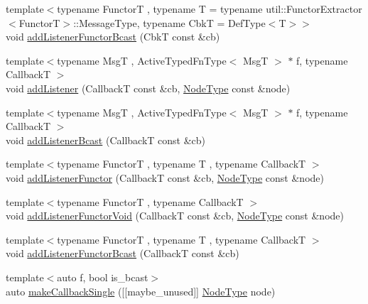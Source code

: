\begin{DoxyCompactItemize}
\item 
{\footnotesize template$<$typename FunctorT , typename T  = typename util\+::\+Functor\+Extractor$<$\+Functor\+T$>$\+::\+Message\+Type, typename CbkT  = Def\+Type$<$\+T$>$$>$ }\\void \hyperlink{structvt_1_1pipe_1_1_pipe_manager_t_l_a3bbcc3d70bb6840ede74747011f18ea8}{add\+Listener\+Functor\+Bcast} (CbkT const \&cb)
\item 
{\footnotesize template$<$typename MsgT , Active\+Typed\+Fn\+Type$<$ Msg\+T $>$ $\ast$ f, typename CallbackT $>$ }\\void \hyperlink{structvt_1_1pipe_1_1_pipe_manager_t_l_ae1aee468ba813cc359e3d3602722b161}{add\+Listener} (CallbackT const \&cb, \hyperlink{namespacevt_a866da9d0efc19c0a1ce79e9e492f47e2}{Node\+Type} const \&node)
\item 
{\footnotesize template$<$typename MsgT , Active\+Typed\+Fn\+Type$<$ Msg\+T $>$ $\ast$ f, typename CallbackT $>$ }\\void \hyperlink{structvt_1_1pipe_1_1_pipe_manager_t_l_af50d2867536e0b9db56560126c3da066}{add\+Listener\+Bcast} (CallbackT const \&cb)
\item 
{\footnotesize template$<$typename FunctorT , typename T , typename CallbackT $>$ }\\void \hyperlink{structvt_1_1pipe_1_1_pipe_manager_t_l_aca69c630748b177c01af61b39ffad0ec}{add\+Listener\+Functor} (CallbackT const \&cb, \hyperlink{namespacevt_a866da9d0efc19c0a1ce79e9e492f47e2}{Node\+Type} const \&node)
\item 
{\footnotesize template$<$typename FunctorT , typename CallbackT $>$ }\\void \hyperlink{structvt_1_1pipe_1_1_pipe_manager_t_l_a12039964ec1deb173f0ee83ad4c8a543}{add\+Listener\+Functor\+Void} (CallbackT const \&cb, \hyperlink{namespacevt_a866da9d0efc19c0a1ce79e9e492f47e2}{Node\+Type} const \&node)
\item 
{\footnotesize template$<$typename FunctorT , typename T , typename CallbackT $>$ }\\void \hyperlink{structvt_1_1pipe_1_1_pipe_manager_t_l_a7f59d9749248fb963a7c279a053fe220}{add\+Listener\+Functor\+Bcast} (CallbackT const \&cb)
\item 
{\footnotesize template$<$auto f, bool is\+\_\+bcast$>$ }\\auto \hyperlink{structvt_1_1pipe_1_1_pipe_manager_t_l_ad44c0b56f3af58ee20319cd4ed169332}{make\+Callback\+Single} (\mbox{[}\mbox{[}maybe\+\_\+unused\mbox{]}\mbox{]} \hyperlink{namespacevt_a866da9d0efc19c0a1ce79e9e492f47e2}{Node\+Type} node)

\end{DoxyCompactItemize}
